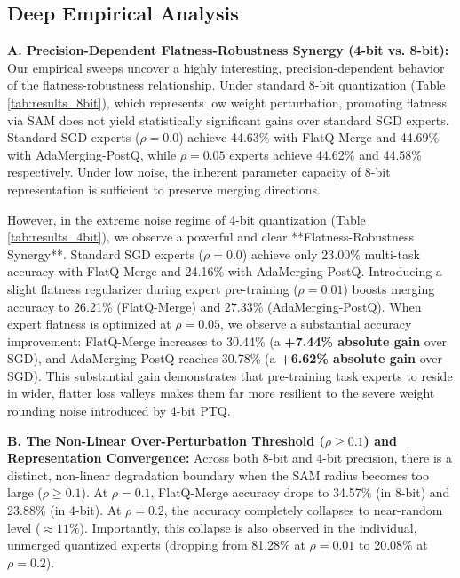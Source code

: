 \subsection{Deep Empirical Analysis}

\textbf{A. Precision-Dependent Flatness-Robustness Synergy (4-bit vs. 8-bit):}
Our empirical sweeps uncover a highly interesting, precision-dependent behavior of the flatness-robustness relationship. Under standard 8-bit quantization (Table \ref{tab:results_8bit}), which represents low weight perturbation, promoting flatness via SAM does not yield statistically significant gains over standard SGD experts. Standard SGD experts ($\rho=0.0$) achieve 44.63\% with FlatQ-Merge and 44.69\% with AdaMerging-PostQ, while $\rho=0.05$ experts achieve 44.62\% and 44.58\% respectively. Under low noise, the inherent parameter capacity of 8-bit representation is sufficient to preserve merging directions.

However, in the extreme noise regime of 4-bit quantization (Table \ref{tab:results_4bit}), we observe a powerful and clear **Flatness-Robustness Synergy**. Standard SGD experts ($\rho=0.0$) achieve only 23.00\% multi-task accuracy with FlatQ-Merge and 24.16\% with AdaMerging-PostQ.
Introducing a slight flatness regularizer during expert pre-training ($\rho=0.01$) boosts merging accuracy to 26.21\% (FlatQ-Merge) and 27.33\% (AdaMerging-PostQ).
When expert flatness is optimized at $\rho=0.05$, we observe a substantial accuracy improvement: FlatQ-Merge increases to 30.44\% (a \textbf{+7.44\% absolute gain} over SGD), and AdaMerging-PostQ reaches 30.78\% (a \textbf{+6.62\% absolute gain} over SGD).
This substantial gain demonstrates that pre-training task experts to reside in wider, flatter loss valleys makes them far more resilient to the severe weight rounding noise introduced by 4-bit PTQ.

\textbf{B. The Non-Linear Over-Perturbation Threshold ($\rho \ge 0.1$) and Representation Convergence:}
Across both 8-bit and 4-bit precision, there is a distinct, non-linear degradation boundary when the SAM radius becomes too large ($\rho \ge 0.1$). At $\rho = 0.1$, FlatQ-Merge accuracy drops to 34.57\% (in 8-bit) and 23.88\% (in 4-bit). At $\rho = 0.2$, the accuracy completely collapses to near-random level ($\approx 11\%$).
Importantly, this collapse is also observed in the individual, unmerged quantized experts (dropping from 81.28\% at $\rho=0.01$ to 20.08\% at $\rho=0.2$).

